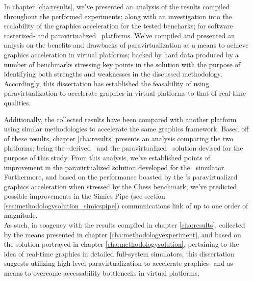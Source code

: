 In chapter \ref{cha:results}, we've presented an analysis of the results compiled throughout the performed experiments; along with an investigation into the scalability of the graphics acceleration for the tested bencharks; for software rasterized- and paravirtualized \dvttermsimics\ platforms.
We've compiled and presented an anlysis on the benefits and drawbacks of paravirtualization as a means to achieve graphics acceleration in virtual platforms; backed by hard data produced by a number of benchmarks stressing key points in the solution with the purpose of identifying both strengths and weaknesses in the discussed methodology.
Accordingly, this dissertation has established the feasability of using paravirtualization to accelerate graphics in virtual platforms to that of real-time qualities.

Additionally, the collected results have been compared with another platform using similar methodologies to accelerate the same graphics framework.
Based off of these results, chapter \ref{cha:results} presents an analysis comparing the two platforms; being the \dvttermqemu -derived \dvttermandroidemulator\ and the paravirtualized \dvttermsimics\ solution devised for the purpose of this study.
From this analysis, we've established points of improvement in the paravirtualized solution developed for the \dvttermsimics\ simulator.
Furthermore, and based on the performance boasted by the \dvttermandroidemulator 's paravirtualized graphics acceleration when stressed by the Chess benchmark, we've predicted possible improvements in the Simics Pipe (see section \ref{sec:methodologysolution_simicspipe}) communications link of up to one order of magnitude.\\

\noindent
As such, in coagency with the results compiled in chapter \ref{cha:results}, collected by the means presented in chapter \ref{cha:methodologyexperiment}, and based on the solution portrayed in chapter \ref{cha:methodologysolution}, pertaining to the idea of real-time graphics in detailed full-system simulators, this dissertation suggests utilizing high-level paravirtualization to accelerate graphics- and as means to overcome accessability bottlenecks in virtual platforms.
